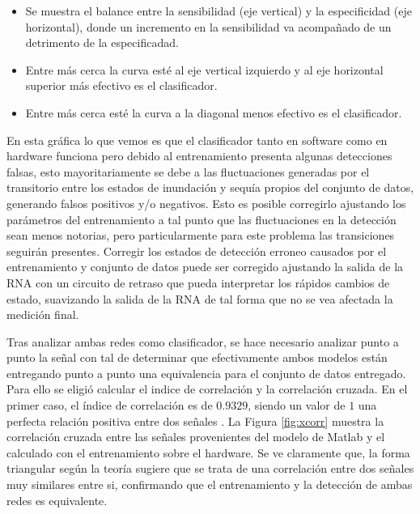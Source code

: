  \begin{itemize}
     \item Se muestra el balance entre la sensibilidad (eje vertical) y la especificidad (eje horizontal), donde un incremento en la sensibilidad va acompañado de un detrimento de la especificadad.
     \item Entre más cerca la curva esté al eje vertical izquierdo y al eje horizontal superior más efectivo es el clasificador.
     \item Entre más cerca esté la curva a la diagonal menos efectivo es el clasificador.
 \end{itemize}
 
 En esta gráfica lo que vemos es que el clasificador tanto en software como en hardware funciona pero debido al entrenamiento presenta algunas detecciones falsas, esto mayoritariamente se debe a las fluctuaciones generadas por el transitorio entre los estados de inundación y sequía propios del conjunto de datos, generando falsos positivos y/o negativos. Esto es posible corregirlo ajustando los parámetros del entrenamiento a tal punto que las fluctuaciones en la detección sean menos notorias, pero particularmente para este problema las transiciones seguirán presentes. Corregir los estados de detección erroneo causados por el entrenamiento y conjunto de datos puede ser corregido ajustando la salida de la RNA con un circuito de retraso que pueda interpretar los rápidos cambios de estado, suavizando la salida de la RNA de tal forma que no se vea afectada la medición final.


Tras analizar ambas redes como clasificador, se hace necesario analizar punto a punto la señal con tal de determinar que efectivamente ambos modelos están entregando punto a punto una equivalencia para el conjunto de datos entregado. Para ello se eligió calcular el indice de correlación y la correlación cruzada. En el primer caso, el índice de correlación es de $0.9329$, siendo un valor de $1$ una perfecta relación positiva entre dos señales \citep{correlation2,correlation}. La Figura \ref{fig:xcorr} muestra la correlación cruzada entre las señales provenientes del modelo de Matlab y el calculado con el entrenamiento sobre el hardware. Se ve claramente que, la forma triangular según la teoría sugiere que se trata de una correlación entre dos señales muy similares entre si, confirmando que el entrenamiento y la detección de ambas redes es equivalente.

